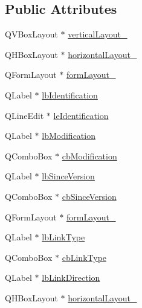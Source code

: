 \subsection*{Public Attributes}
\begin{DoxyCompactItemize}
\item 
Q\-V\-Box\-Layout $\ast$ \hyperlink{class_ui__mdt_cl_unit_link_dialog_ad5f9c3ae01fe80b5b3d99176b75e725a}{vertical\-Layout\-\_}
\item 
Q\-H\-Box\-Layout $\ast$ \hyperlink{class_ui__mdt_cl_unit_link_dialog_ad0092bded4ca58a8fee1778885d8f851}{horizontal\-Layout\-\_}
\item 
Q\-Form\-Layout $\ast$ \hyperlink{class_ui__mdt_cl_unit_link_dialog_a9b4ea9a53fb5d2ff39af58223f668e46}{form\-Layout\-\_}
\item 
Q\-Label $\ast$ \hyperlink{class_ui__mdt_cl_unit_link_dialog_a6e0b165d599556404cb67ac1aaf09de8}{lb\-Identification}
\item 
Q\-Line\-Edit $\ast$ \hyperlink{class_ui__mdt_cl_unit_link_dialog_a17fea8e34e0496a1dd5ed10091673f2a}{le\-Identification}
\item 
Q\-Label $\ast$ \hyperlink{class_ui__mdt_cl_unit_link_dialog_a890d42d154116f3a574ebf14daedb79c}{lb\-Modification}
\item 
Q\-Combo\-Box $\ast$ \hyperlink{class_ui__mdt_cl_unit_link_dialog_ad6114a32abcca7a6780dbda5ceb14f0b}{cb\-Modification}
\item 
Q\-Label $\ast$ \hyperlink{class_ui__mdt_cl_unit_link_dialog_a461ab0e1ce3859dc45737e0103d8ff2f}{lb\-Since\-Version}
\item 
Q\-Combo\-Box $\ast$ \hyperlink{class_ui__mdt_cl_unit_link_dialog_a7047e8b391f10f9526515a0daaed5254}{cb\-Since\-Version}
\item 
Q\-Form\-Layout $\ast$ \hyperlink{class_ui__mdt_cl_unit_link_dialog_a8afca4823d551f46a7fc6b7216e2c77c}{form\-Layout\-\_}
\item 
Q\-Label $\ast$ \hyperlink{class_ui__mdt_cl_unit_link_dialog_aa441f76b8c0e0aa058808424275abdd5}{lb\-Link\-Type}
\item 
Q\-Combo\-Box $\ast$ \hyperlink{class_ui__mdt_cl_unit_link_dialog_aee6a2a148c7b6552d1531b189811c6c5}{cb\-Link\-Type}
\item 
Q\-Label $\ast$ \hyperlink{class_ui__mdt_cl_unit_link_dialog_a187f5c4b83a461eed99d15f035d5a7fa}{lb\-Link\-Direction}
\item 
Q\-H\-Box\-Layout $\ast$ \hyperlink{class_ui__mdt_cl_unit_link_dialog_a411e59c409336545507273a988f433b6}{horizontal\-Layout\-\_}

\end{DoxyCompactItemize}
